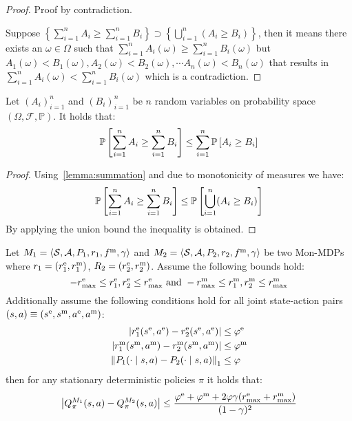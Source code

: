 %
\begin{proof}
        Proof by contradiction.
        
        Suppose $\left\{\sum_{i=1}^{n}A_i \geq \sum_{i=1}^{n}B_i \right\} \supset \left\{\bigcup^n_{i = 1}(A_i \geq B_i)\right\}$, then it means there exists an $\omega \in \Omega$ such that $\sum_{i=1}^{n}A_i(\omega) \geq \sum_{i=1}^{n}B_i(\omega)$ but $A_1(\omega) < B_1(\omega), A_2(\omega) < B_2(\omega), \cdots A_n(\omega) < B_n(\omega)$ that results in $\sum_{i=1}^{n}A_i(\omega) < \sum_{i=1}^{n}B_i(\omega)$ which is a contradiction. \qedhere
    \end{proof}
%
\begin{corollary}
    \label{corollary:union_bound}
        Let $(A_i)^n_{i = 1}$ and $(B_i)^n_{i = 1}$ be $n$ random variables on probability space $(\Omega, \mathcal{F}, \mathbb{P})$. It holds that:
        \begin{equation*}
            \mathbb{P}\left[ {\sum_{i=1}^{n}A_i \geq \sum_{i=1}^{n}B_i} \right] \leq \sum_{i = 1}^{n}\mathbb{P}\left[ {A_i \geq B_i} \right]
        \end{equation*}
        \begin{proof}
            Using~\cref{lemma:summation} and due to monotonicity of measures we have:
            \begin{equation*}
            \mathbb{P}\left[ {\sum_{i=1}^{n}A_i \geq \sum_{i=1}^{n}B_i } \right] \leq \mathbb{P}\left[ {\bigcup^n_{i = 1}(A_i \geq B_i)} \right]
        \end{equation*}
        By applying the union bound the inequality is obtained.
        \end{proof}
    \end{corollary}
%
\begin{lemma}
\label{lemma:general_closeness}
    Let $M_1 = \left\langle \mathcal{S}, \mathcal{A}, P_1, r_1, f^\text{m}, \gamma \right\rangle$ and $M_2 = \left\langle \mathcal{S}, \mathcal{A}, P_2, r_2, f^\text{m}, \gamma \right\rangle$ be two Mon-MDPs where $r_1 = (r^\text{e}_1, r^\text{m}_1)$, $R_2 = (r^\text{e}_2, r^\text{m}_2)$. Assume the following bounds hold:
    \begin{equation*}
        -r_{\text{max}}^\text{e} \leq r^\text{e}_1, r^\text{e}_2 \leq r_{\text{max}}^\text{e} \text{ and } -r_{\text{max}}^\text{m} \leq r^\text{m}_1, r^\text{m}_2 \leq r_{\text{max}}^\text{m}
    \end{equation*}
    Additionally assume the following conditions hold for all joint state-action pairs $(s, a) \equiv (s^\text{e}, s^\text{m}, a^\text{e}, a^\text{m})$: 
    \begin{align*}
    \left \lvert r^\text{e}_1(s^\text{e}, a^\text{e}) - r^\text{e}_2(s^\text{e}, a^\text{e}) \right \rvert & \leq \varphi^\text{e} \\
    \left \lvert r^\text{m}_1(s^\text{m}, a^\text{m}) - r^\text{m}_2(s^\text{m}, a^\text{m}) \right \rvert & \leq \varphi^\text{m} \\
    \left \lVert P_1(\cdot \mid s, a) - P_2(\cdot \mid s, a) \right \rVert_1 & \leq \varphi
    \end{align*}
    then for any stationary deterministic policies $\pi$ it holds that:
    \begin{equation*}
        \left \lvert Q^{M_1}_\pi(s, a) - Q^{M_2}_\pi(s, a) \right \rvert \leq \frac{\varphi^\text{e} + \varphi^\text{m} + 2\varphi\gamma(r_{\text{max}}^\text{e} + r_{\text{max}}^\text{m})}{(1 - \gamma)^2}
    \end{equation*}
\end{lemma}
